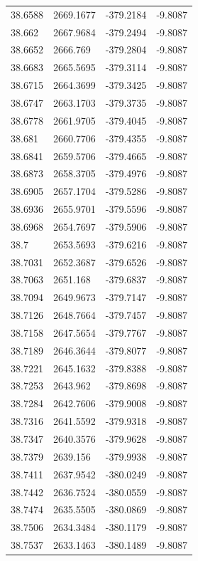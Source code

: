 \begin{table}[H]
\begin{tabular}{llll}
38.6588 & 2669.1677 & -379.2184 & -9.8087 \\
38.662 & 2667.9684 & -379.2494 & -9.8087 \\
38.6652 & 2666.769 & -379.2804 & -9.8087 \\
38.6683 & 2665.5695 & -379.3114 & -9.8087 \\
38.6715 & 2664.3699 & -379.3425 & -9.8087 \\
38.6747 & 2663.1703 & -379.3735 & -9.8087 \\
38.6778 & 2661.9705 & -379.4045 & -9.8087 \\
38.681 & 2660.7706 & -379.4355 & -9.8087 \\
38.6841 & 2659.5706 & -379.4665 & -9.8087 \\
38.6873 & 2658.3705 & -379.4976 & -9.8087 \\
38.6905 & 2657.1704 & -379.5286 & -9.8087 \\
38.6936 & 2655.9701 & -379.5596 & -9.8087 \\
38.6968 & 2654.7697 & -379.5906 & -9.8087 \\
38.7 & 2653.5693 & -379.6216 & -9.8087 \\
38.7031 & 2652.3687 & -379.6526 & -9.8087 \\
38.7063 & 2651.168 & -379.6837 & -9.8087 \\
38.7094 & 2649.9673 & -379.7147 & -9.8087 \\
38.7126 & 2648.7664 & -379.7457 & -9.8087 \\
38.7158 & 2647.5654 & -379.7767 & -9.8087 \\
38.7189 & 2646.3644 & -379.8077 & -9.8087 \\
38.7221 & 2645.1632 & -379.8388 & -9.8087 \\
38.7253 & 2643.962 & -379.8698 & -9.8087 \\
38.7284 & 2642.7606 & -379.9008 & -9.8087 \\
38.7316 & 2641.5592 & -379.9318 & -9.8087 \\
38.7347 & 2640.3576 & -379.9628 & -9.8087 \\
38.7379 & 2639.156 & -379.9938 & -9.8087 \\
38.7411 & 2637.9542 & -380.0249 & -9.8087 \\
38.7442 & 2636.7524 & -380.0559 & -9.8087 \\
38.7474 & 2635.5505 & -380.0869 & -9.8087 \\
38.7506 & 2634.3484 & -380.1179 & -9.8087 \\
38.7537 & 2633.1463 & -380.1489 & -9.8087 \\

\end{tabular}
\end{table}
